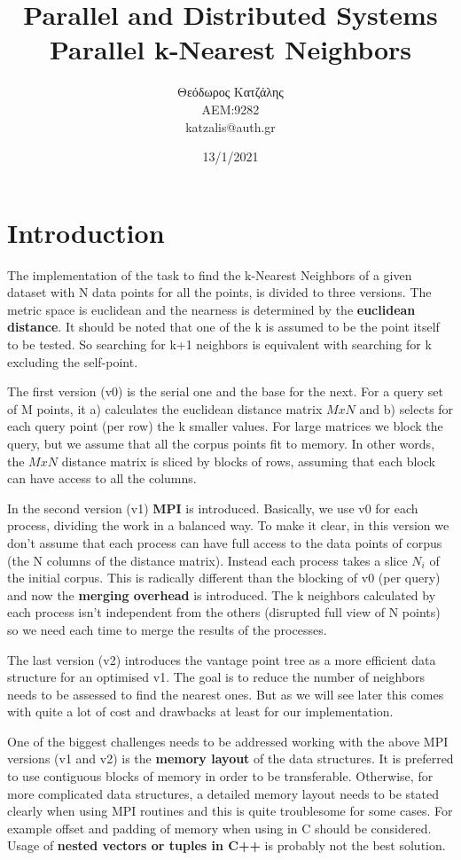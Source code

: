 \documentclass[12pt, a4paper]{article}
\title{\textbf{Parallel and Distributed Systems \\ Parallel k-Nearest Neighbors}}
\author{Θεόδωρος Κατζάλης \\ ΑΕΜ:9282 \\ katzalis@auth.gr}
\date{13/1/2021}
\begin{document}
\sloppy
%
\maketitle



\section{Introduction}

The implementation of the task to find the k-Nearest Neighbors of a given dataset with N data points for all the points, is divided to three versions. The metric space is euclidean and the nearness is determined by the \textbf{euclidean distance}. It should be noted that one of the k is assumed to be the point itself to be tested. So searching for k+1 neighbors is equivalent with searching for k excluding the self-point.

The first version (v0) is the serial one and the base for the next. For a query set of M points, it a) calculates the euclidean distance matrix $MxN$ and b) selects for each query point (per row) the k smaller values. For large matrices we block the query, but we assume that all the corpus points fit to memory. In other words, the $MxN$ distance matrix is sliced by blocks of rows, assuming that each block can have access to all the columns. 

In the second version (v1) \textbf{MPI} is introduced. Basically, we use v0 for each process, dividing the work in a balanced way. To make it clear, in this version we don't assume that each process can have full access to the data points of corpus (the N columns of the distance matrix). Instead each process takes a slice $N_i$ of the initial corpus. This is radically different than the blocking of v0 (per query) and now the \textbf{merging overhead} is introduced. The k neighbors calculated by each process isn't independent from the others (disrupted full view of N points) so we need each time to merge the results of the processes.

The last version (v2) introduces the vantage point tree as a more efficient data structure for an optimised v1. The goal is to reduce the number of neighbors needs to be assessed to find the nearest ones. But as we will see later this comes with quite a lot of cost and drawbacks at least for our implementation.

One of the biggest challenges needs to be addressed working with the above MPI versions (v1 and v2) is the \textbf{memory layout} of the data structures. It is preferred to use contiguous blocks of memory in order to be transferable. Otherwise, for more complicated data structures, a detailed memory layout needs to be stated clearly when using MPI routines and this is quite troublesome for some cases. For example offset and padding of memory when using  in C should be considered. Usage of \textbf{nested vectors or tuples in C++} is probably not the best solution.  
\end{document}
